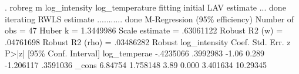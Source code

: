 . robreg m log_intensity log_temperature
fitting initial LAV estimate ... done
iterating RWLS estimate ........... done
{\smallskip}
M-Regression (95\% efficiency)                   Number of obs     =         47
                                                  Huber k         =  1.3449986
                                                  Scale estimate  =  .63061122
                                                  Robust R2 (w)   =  .04761698
                                                  Robust R2 (rho) =  .03486282
{\smallskip}
              {\VBAR}               Robust
log_intensity {\VBAR}      Coef.   Std. Err.      z    P>|z|     [95\% Conf. Interval]
log_tempera{\tytilde}e {\VBAR}  -.4235066   .3992983    -1.06   0.289    -1.206117    .3591036
        _cons {\VBAR}    6.84754   1.758148     3.89   0.000     3.401634    10.29345
{\smallskip}
